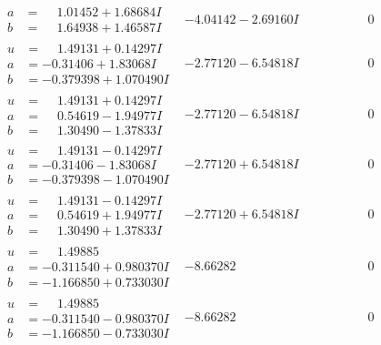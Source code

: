\documentclass[1p]{elsarticle_modified}
\theoremstyle{definition}
\begin{document}
$$\begin{array}{c|c|c}
\begin{aligned}
a &= \phantom{-}1.01452 + 1.68684 I \\
b &= \phantom{-}1.64938 + 1.46587 I\end{aligned}
 & -4.04142 - 2.69160 I & \phantom{-0.000000 } 0 \\ \hline\begin{aligned}
u &= \phantom{-}1.49131 + 0.14297 I \\
a &= -0.31406 + 1.83068 I \\
b &= -0.379398 + 1.070490 I\end{aligned}
 & -2.77120 - 6.54818 I & \phantom{-0.000000 } 0 \\ \hline\begin{aligned}
u &= \phantom{-}1.49131 + 0.14297 I \\
a &= \phantom{-}0.54619 - 1.94977 I \\
b &= \phantom{-}1.30490 - 1.37833 I\end{aligned}
 & -2.77120 - 6.54818 I & \phantom{-0.000000 } 0 \\ \hline\begin{aligned}
u &= \phantom{-}1.49131 - 0.14297 I \\
a &= -0.31406 - 1.83068 I \\
b &= -0.379398 - 1.070490 I\end{aligned}
 & -2.77120 + 6.54818 I & \phantom{-0.000000 } 0 \\ \hline\begin{aligned}
u &= \phantom{-}1.49131 - 0.14297 I \\
a &= \phantom{-}0.54619 + 1.94977 I \\
b &= \phantom{-}1.30490 + 1.37833 I\end{aligned}
 & -2.77120 + 6.54818 I & \phantom{-0.000000 } 0 \\ \hline\begin{aligned}
u &= \phantom{-}1.49885\phantom{ +0.000000I} \\
a &= -0.311540 + 0.980370 I \\
b &= -1.166850 + 0.733030 I\end{aligned}
 & -8.66282\phantom{ +0.000000I} & \phantom{-0.000000 } 0 \\ \hline\begin{aligned}
u &= \phantom{-}1.49885\phantom{ +0.000000I} \\
a &= -0.311540 - 0.980370 I \\
b &= -1.166850 - 0.733030 I\end{aligned}
 & -8.66282\phantom{ +0.000000I} & \phantom{-0.000000 } 0\\

\end{array}$$
\end{document}
